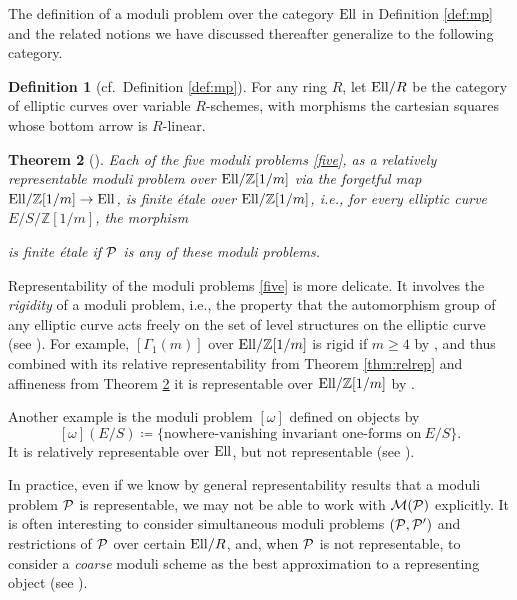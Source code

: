 \documentclass{gtpart}
\newtheorem{thm}{Theorem}
\theoremstyle{definition}
\newtheorem{defn}[thm]{Definition}
\theoremstyle{remark}
\newcommand{\mb}[1]{\mathbb{#1}}
\newcommand{\Ell}{{\rm Ell}}
\newcommand{\CM}{{\cal M}}
\newcommand{\CP}{{\cal P}}
\newcommand{\BZ}{{\mb Z}}
\newcommand{\G}{\Gamma}
\newcommand{\ce}{\coloneqq}
\numberwithin{equation}{section}
\numberwithin{thm}{section}
\begin{document}
The definition of a moduli problem over the category $\Ell$ in 
Definition \ref{def:mp} and the related notions we have discussed 
thereafter generalize to the following category.  

\begin{defn}[cf.~Definition \ref{def:mp}]
\label{def:mpR}
 For any ring $R$, let $\Ell/R$ be the category of elliptic curves over 
 variable $R$-schemes, with morphisms the cartesian squares whose bottom 
 arrow is $R$-linear.  
\end{defn}

\begin{thm}[{\cite[3.7.1, 7.9.6, and 7.1.3(2)]{KM}}]
\label{thm:affine}
 Each of the five moduli problems \eqref{five}, as a relatively 
 representable moduli problem over $\Ell/\BZ[1/m]$ via the forgetful map 
 $\Ell/\BZ[1/m] \to \Ell$, is finite \'etale over $\Ell/\BZ[1/m]$, i.e., 
 for every elliptic curve $E/S/\BZ[1/m]$, the morphism 
 \begin{center}
 \end{center}
 is finite \'etale if $\CP$ is any of these moduli problems.  
\end{thm}

Representability of the moduli problems \eqref{five} is more delicate.  
It involves the {\em rigidity} of a moduli problem, i.e., the property 
that the automorphism group of any elliptic curve acts freely on the set 
of level structures on the elliptic curve (see 
\cite[4.4, 4.7, and 2.7]{KM}).  For example, $[\G_1(m)]$ over 
$\Ell/\BZ[1/m]$ is rigid if $m \geq 4$ by \cite[2.7.3]{KM}, and thus 
combined with its relative representability from Theorem 
\ref{thm:relrep} and affineness from Theorem \ref{thm:affine} it is 
representable over $\Ell/\BZ[1/m]$ by \cite[4.7.0]{KM}.  

Another example is the moduli problem $[\omega]$ defined on objects by 
\[
 [\omega](E/S) \ce \{ \text{nowhere-vanishing invariant one-forms on} 
 ~ E/S \}.  
\]
It is relatively representable over $\Ell$, but not representable (see 
\cite[8.1.7.1]{KM}).  

In practice, even if we know by general representability results that a 
moduli problem $\CP$ is representable, we may not be able to work with 
$\CM(\CP)$ explicitly.  It is often interesting to consider simultaneous 
moduli problems $(\CP,\CP')$ and restrictions of $\CP$ over certain 
$\Ell/R$, and, when $\CP$ is not representable, to consider a 
{\em coarse} moduli scheme as the best approximation to a representing 
object (see \cite[Chapter 8]{KM}).  
\end{document}
